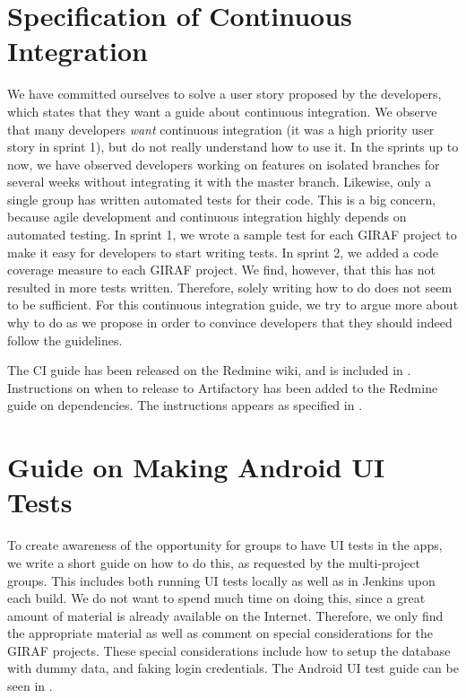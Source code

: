 \section{Specification of Continuous Integration}\label{sec:specsCI}
We have committed ourselves to solve a user story proposed by the developers, which states that they want a guide about continuous integration. We observe that many developers \emph{want} continuous integration (it was a high priority user story in sprint 1), but do not really understand how to use it. In the sprints up to now, we have observed developers working on features on isolated branches for several weeks without integrating it with the master branch. Likewise, only a single group has written automated tests for their code. This is a big concern, because agile development and continuous integration highly depends on automated testing. In sprint 1, we wrote a sample test for each GIRAF project to make it easy for developers to start writing tests. In sprint 2, we added a code coverage measure to each GIRAF project. We find, however, that this has not resulted in more tests written. Therefore, solely writing how to do does not seem to be sufficient. For this continuous integration guide, we try to argue more about why to do as we propose in order to convince developers that they should indeed follow the guidelines.

The CI guide has been released on the Redmine wiki, and is included in . Instructions on when to release to Artifactory has been added to the Redmine guide on dependencies. The instructions appears as specified in .

\section{Guide on Making Android UI Tests}\label{sec:uitestguide}
To create awareness of the opportunity for groups to have UI tests in the apps, we write a short guide on how to do this, as requested by the multi-project groups. This includes both running UI tests locally as well as in Jenkins upon each build. We do not want to spend much time on doing this, since a great amount of material is already available on the Internet. Therefore, we only find the appropriate material as well as comment on special considerations for the GIRAF projects. These special considerations include how to setup the database with dummy data, and faking login credentials. The Android UI test guide can be seen in .